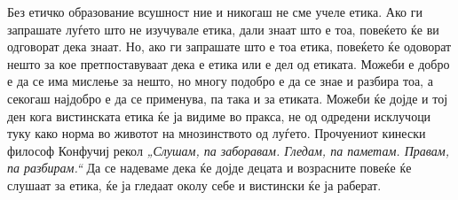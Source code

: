 \documentclass[12pt,a4paper]{article}
\begin{document}
Без етичко образование всушност ние и никогаш не сме учеле етика. Ако ги
запрашате луѓето што не изучувале етика, дали знаат што е тоа, повеќето ќе ви
одговорат дека знаат. Но, ако ги запрашате што е тоа етика, повеќето ќе одоворат
нешто за кое претпоставуваат дека е етика или е дел од етиката. Можеби е добро е
да се има мислење за нешто, но многу подобро е да се знае и разбира тоа, а
секогаш најдобро е да се применува, па така и за етиката. Можеби ќе дојде и тој
ден кога вистинската етика ќе ја видиме во пракса, не од одредени исклучоци
туку како норма во животот на мнозинството од луѓето. Прочуениот кинески философ
Конфучиј рекол \emph{„Слушам, па заборавам. Гледам, па паметам. Правам, па
разбирам.“} Да се надеваме дека ќе дојде децата и возрасните повеќе ќе слушаат
за етика, ќе ја гледаат околу себе и вистински ќе ја раберат.
\end{document}
